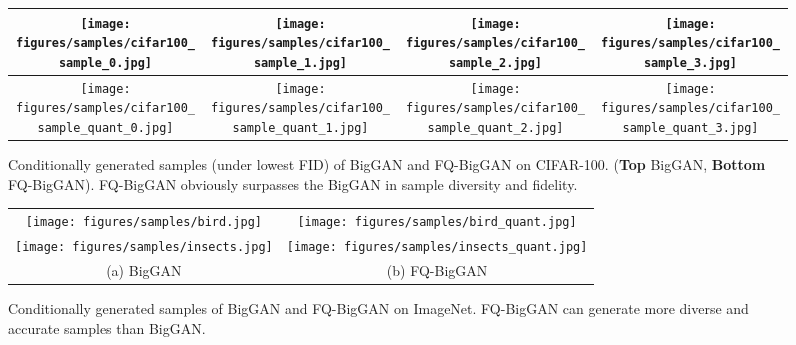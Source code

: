 \documentclass{article}
\begin{document}
\begin{figure*}[t!]\vspace{-0mm}\centering
	\begin{tabular}{c c c c}
		\texttt{[image: figures/samples/cifar100\_sample\_0.jpg]}  & 
		\texttt{[image: figures/samples/cifar100\_sample\_1.jpg]}  &
		\texttt{[image: figures/samples/cifar100\_sample\_2.jpg]}  &
		\texttt{[image: figures/samples/cifar100\_sample\_3.jpg]}  \\ \bottomrule
		\addlinespace[1ex] \texttt{[image: figures/samples/cifar100\_sample\_quant\_0.jpg]}  &
		\texttt{[image: figures/samples/cifar100\_sample\_quant\_1.jpg]}  &
		\texttt{[image: figures/samples/cifar100\_sample\_quant\_2.jpg]}  &
		\texttt{[image: figures/samples/cifar100\_sample\_quant\_3.jpg]} \\
	\end{tabular}
	\vspace{-0mm}
	\caption{Conditionally generated samples (under lowest FID) of BigGAN and FQ-BigGAN on CIFAR-100. (\textbf{Top} BigGAN, \textbf{Bottom} FQ-BigGAN). FQ-BigGAN obviously surpasses the BigGAN in sample diversity and fidelity.}
	\vspace{-0mm}
	\label{fig:cifar100_sup}
\end{figure*}

\begin{figure*}[!t]\vspace{-0mm}\centering
	\begin{tabular}{c | c}
		\texttt{[image: figures/samples/bird.jpg]}  & 
		\texttt{[image: figures/samples/bird\_quant.jpg]}  \\
		\texttt{[image: figures/samples/insects.jpg]}  &
		\texttt{[image: figures/samples/insects\_quant.jpg]} \\
		(a) BigGAN \hspace{0mm} & 
		(b) FQ-BigGAN \hspace{-0mm} \\ 
	\end{tabular}
	\vspace{-0mm}
	\caption{Conditionally generated samples of BigGAN and FQ-BigGAN on ImageNet. FQ-BigGAN can generate more diverse and accurate samples than BigGAN.}
	\vspace{-0mm}
	\label{fig:imagenet_sup}
\end{figure*}
\end{document}
